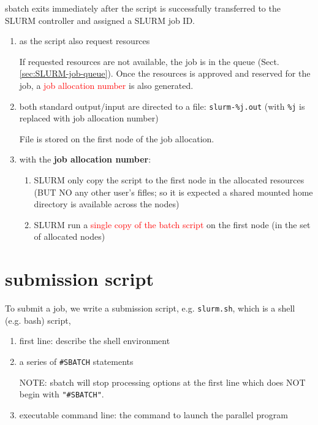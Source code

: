 sbatch exits immediately after the script is  successfully  transferred to  the
SLURM controller and assigned a SLURM job ID.
\begin{enumerate}
  \item as the script also request resources
  
  If requested resources are not available, the job is in the queue
  (Sect.\ref{sec:SLURM-job-queue}). Once the resources is approved and reserved
  for the job, a \textcolor{red}{job allocation number} is also generated.
  
  \item both standard output/input are directed to a file:
  \verb!slurm-%j.out! (with \verb!%j! is replaced with job allocation number)
  
 File is stored on the first node of the job allocation.
 

  \item with the {\bf job allocation number}:
  \begin{enumerate}
    \item 
  SLURM only copy the script to the first node in the allocated resources (BUT
  NO any other user's fifles; so it is expected a shared mounted home directory
  is available across the nodes)
  
    \item SLURM run a \textcolor{red}{single copy of the batch script} on the
    first node (in the set of allocated nodes)
   
    
  \end{enumerate}
  
  
\end{enumerate}





\section{submission script}
\label{sec:SLURM-submission-script}

To submit a job, we write a submission script, e.g. \verb!slurm.sh!, which is a
shell (e.g. bash) script, 
\begin{enumerate}
  \item first line: describe the shell environment
  
  \item a series of \verb!#SBATCH! statements
  
NOTE: sbatch  will stop  processing  options  at  the first line which does NOT begin
with  \verb!"#SBATCH"!.
  
  \item executable command line: the command to launch the parallel program 
\end{enumerate}


